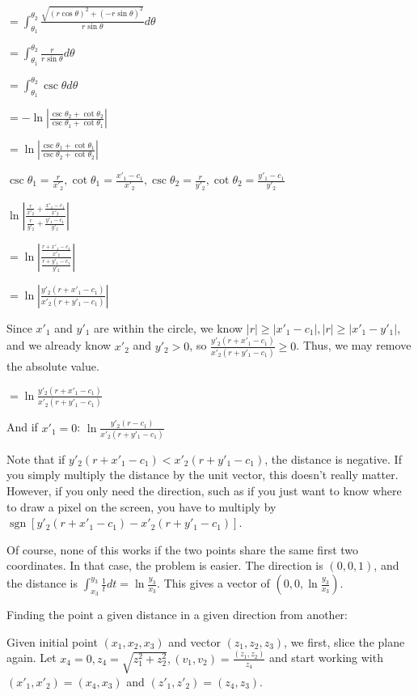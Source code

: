 \documentclass[12pt]{amsart}
\newcommand{\sgn}{\mathop{\mathrm{sgn}}}
\begin{document}
$= \int_{\theta_1}^{\theta_2} \frac{\sqrt{(r\cos\theta)^2+(-r\sin\theta)^2}}{r\sin\theta} d\theta$

$= \int_{\theta_1}^{\theta_2} \frac{r}{r\sin\theta} d\theta$

$= \int_{\theta_1}^{\theta_2} \csc\theta d\theta$

$= -\ln\left|\frac{\csc\theta_2+\cot\theta_2}{\csc\theta_1+\cot\theta_1}\right|$

$= \ln\left|\frac{\csc\theta_1+\cot\theta_1}{\csc\theta_2+\cot\theta_2}\right|$

$\csc\theta_1 = \frac{r}{x'_2}, \cot\theta_1 = \frac{x'_1-c_1}{x'_2}, \csc\theta_2 = \frac{r}{y'_2}, \cot\theta_2 = \frac{y'_1-c_1}{y'_2}$

$\ln\left|\frac{\frac{r}{x'_2}+\frac{x'_1-c_1}{x'_2}}{\frac{r}{y'_2}+\frac{y'_1-c_1}{y'_2}}\right|$

$= \ln\left|\frac{\frac{r+x'_1-c_1}{x'_2}}{\frac{r+y'_1-c_1}{y'_2}}\right|$

$= \ln\left|\frac{y'_2(r+x'_1-c_1)}{x'_2(r+y'_1-c_1)}\right|$

Since $x'_1$ and $y'_1$ are within the circle, we know $|r| \geq |x'_1-c_1|, |r| \geq |x'_1-y'_1|$, and we already know $x'_2$ and $y'_2 > 0$, so $\frac{y'_2(r+x'_1-c_1)}{x'_2(r+y'_1-c_1)} \geq 0$. Thus, we may remove the absolute value.

$= \ln\frac{y'_2(r+x'_1-c_1)}{x'_2(r+y'_1-c_1)}$

And if $x'_1 = 0$: $\ln\frac{y'_2(r-c_1)}{x'_2(r+y'_1-c_1)}$

Note that if $y'_2(r+x'_1-c_1) < x'_2(r+y'_1-c_1)$, the distance is negative. If you simply multiply the distance by the unit vector, this doesn't really matter. However, if you only need the direction, such as if you just want to know where to draw a pixel on the screen, you have to multiply by $\sgn[y'_2(r+x'_1-c_1)-x'_2(r+y'_1-c_1)]$.

Of course, none of this works if the two points share the same first two coordinates. In that case, the problem is easier. The direction is $(0,0,1)$, and the distance is $\int_{x_3}^{y_3} \frac{1}{t} dt = \ln\frac{y_3}{x_3}$. This gives a vector of $(0,0,\ln\frac{y_3}{x_3})$.

\bigskip

Finding the point a given distance in a given direction from another:

\bigskip

Given initial point $(x_1,x_2,x_3)$ and vector $(z_1,z_2,z_3)$, we first, slice the plane again. Let $x_4 = 0, z_4 = \sqrt{z_1^2+z_2^2}, (v_1,v_2) = \frac{(z_1,z_2)}{z_4}$ and start working with $(x'_1,x'_2) = (x_4,x_3)$ and $(z'_1,z'_2) = (z_4,z_3)$.
\end{document}
